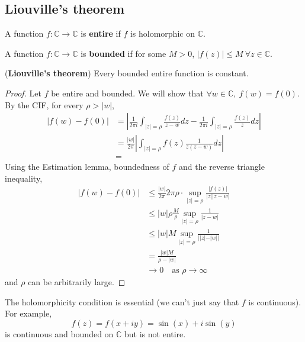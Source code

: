 \subsection{Liouville's theorem}

\begin{definition}
	A function $f: \mathbb{C} \rightarrow \mathbb{C}$ is \textbf{entire} if $f$ is holomorphic on $\mathbb{C}$.
\end{definition}

\begin{definition}
	A function $f: \mathbb{C} \rightarrow \mathbb{C}$ is \textbf{bounded} if for some $M > 0$, $|f(z)| \le M \ \forall z \in \mathbb{C}$.
\end{definition}

\begin{theorem}
	(\textbf{Liouville's theorem}) Every bounded entire function is constant.
\end{theorem}

\begin{proof}
	Let $f$ be entire and bounded. We will show that $\forall w \in \mathbb{C}, \ f(w) = f(0)$. By the CIF, for every $\rho > |w|$,
	\[
		\begin{aligned}
			|f(w) - f(0)|
				& = \left| \frac{1}{2 \pi i} \int_{|z| = \rho} \frac{f(z)}{z - w} dz - \frac{1}{2 \pi i} \int_{|z| = \rho} \frac{f(z)}{z} dz \right| \\
				& = \frac{|w|}{2 \pi} \left| \int_{|z| = \rho} f(z) \frac{1}{z(z - w)} dz \right| \\
				& = 
		\end{aligned}
	\]
	Using the Estimation lemma, boundedness of $f$ and the reverse triangle inequality,
	\[
		\begin{aligned}
			|f(w) - f(0)|
				& \le \frac{|w|}{2 \pi} 2 \pi \rho \cdot \sup_{|z| = \rho} \frac{|f(z)|}{|z| |z - w|} \\
				& \le |w| \rho \frac{M}{\rho} \sup_{|z| = \rho} \frac{1}{|z - w|} \\
				& \le |w| M \sup_{|z| = \rho} \frac{1}{| |z| - |w| |} \\
				& = \frac{|w| M}{\rho - |w|} \\
				& \rightarrow 0 \quad \text{as } \rho \rightarrow \infty
		\end{aligned}
	\]
	and $\rho$ can be arbitrarily large.
\end{proof}

\begin{remark}
	The holomorphicity condition is essential (we can't just say that $f$ is continuous). For example,
	\[
		f(z) = f(x + iy) = \sin(x) + i \sin(y)
	\]
	is continuous and bounded on $\mathbb{C}$ but is not entire.
\end{remark}

